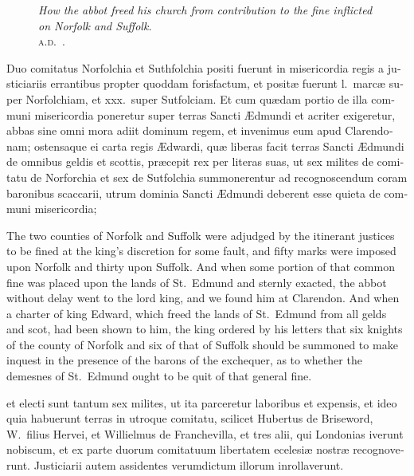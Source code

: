 \documentclass[10pt]{book}
\newcommand{\blockhead}[4][]{
\begin{figure}
\centering
\vspace{#4}
\parbox{2.75cm}{\begin{center}\footnotesize \color{BrickRed} \emph{#2}\\ #1 \end{center}}
\end{figure}
}
\begin{document}
\begin{paracol}{2}
\switchcolumn*

\begin{otherlanguage}{latin}
\blockhead[\textsc{a.d}.\ .]{How the abbot freed his church from contribution to the fine inflicted on Norfolk and Suffolk.}{5}{-.6cm}
Duo comitatus Norfolchia et Suthfolchia positi fuerunt in misericordia regis a justiciariis errantibus propter quoddam forisfactum, et posit\ae{} fuerunt l.\ marc\ae{} super Norfolchiam, et xxx.\ super Sutfolciam. Et cum qu\ae{}dam portio de illa communi misericordia poneretur super terras Sancti \AE{}dmundi et acriter  exigeretur, abbas sine omni mora adiit dominum regem, et invenimus eum apud Clarendonam; ostensaque ei carta regis \AE{}dwardi, qu\ae{} liberas facit terras  Sancti \AE{}dmundi de omnibus geldis et scottis, pr\ae{}cepit rex per literas suas, ut sex milites de comitatu de Norforchia et sex de Sutfolchia summonerentur ad recognoscendum coram baronibus scaccarii, utrum dominia Sancti \AE{}dmundi deberent esse quieta de communi misericordia; 

\end{otherlanguage}

\switchcolumn

The two counties of Norfolk and Suffolk were adjudged by the itinerant justices to be fined at the king's discretion for some fault, and fifty marks were imposed upon Norfolk and thirty upon Suffolk. And when some portion of that common fine was placed upon the lands of St.\ Edmund and sternly exacted, the abbot without delay went to the lord king, and we found him at Clarendon. And when a charter of king Edward, which freed the lands of St.\ Edmund from all gelds and scot, had been shown to him, the king ordered by his letters that six knights of the county of Norfolk and six of that of Suffolk should be summoned to make inquest in the presence of the barons of the exchequer, as to whether the demesnes of St.\ Edmund ought to be quit of that general fine.

\switchcolumn*

\begin{otherlanguage}{latin}
et electi sunt tantum sex milites, ut ita parceretur laboribus et expensis, et ideo quia habuerunt terras in utroque comitatu, scilicet Hubertus de Briseword, W.\ filius Hervei, et Willielmus de Franchevilla, et tres alii, qui Londonias iverunt nobiscum, et ex parte duorum comitatuum libertatem ecelesi\ae{} nostr\ae{} recognoverunt. Justiciarii autem assidentes verumdictum illorum inrollaverunt.
\end{otherlanguage}


\end{paracol}
\end{document}
